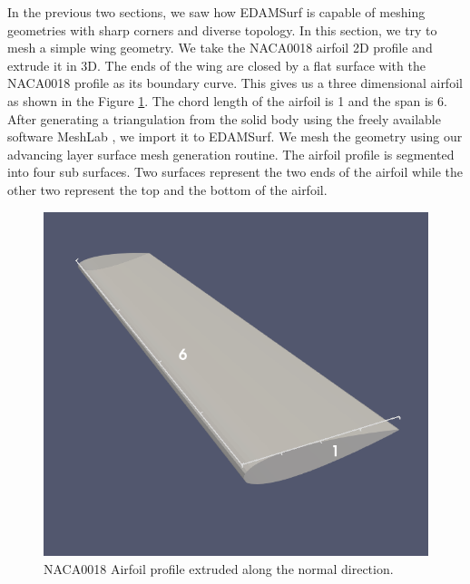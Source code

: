 In the previous two sections, we saw how EDAMSurf is capable of meshing geometries with sharp corners and diverse topology. In this section, we try to mesh a simple wing geometry. We take the NACA0018 airfoil 2D profile and extrude it in 3D. The ends of the wing are closed by a flat surface with the NACA0018 profile as its boundary curve. This gives us a three dimensional airfoil as shown in the Figure \ref{fig-naca0018}. The chord length of the airfoil is 1 and the span is 6. After generating a triangulation from the solid body using the freely available software MeshLab \cite{LocalChapterEvents:ItalChap:ItalianChapConf2008:129-136}, we import it to EDAMSurf. We mesh the geometry using our advancing layer surface mesh generation routine. The airfoil profile is segmented into four sub surfaces. Two surfaces represent the two ends of the airfoil while the other two represent the top and the bottom of the airfoil.



\begin{figure}
	\centering
	\includegraphics[width=0.6\linewidth]{img/r/naca0018.png}
	\caption{NACA0018 Airfoil profile extruded along the normal direction.}
	\label{fig-naca0018}
\end{figure}

